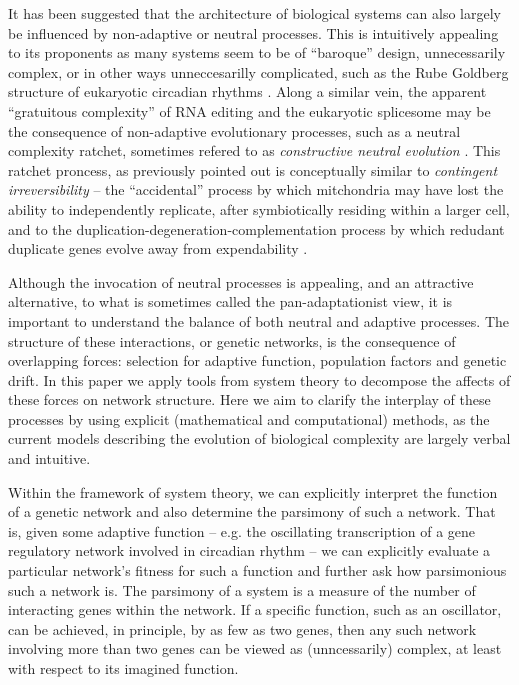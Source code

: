 \documentclass{article}
\newcommand{\1}{\mathbbm{1}}
\begin{document}
It has been suggested that the architecture of biological systems can also largely be influenced by non-adaptive
or neutral processes. This is intuitively appealing to its proponents as many systems seem to be of ``baroque''
design, unnecessarily complex, or in other ways unneccesarilly complicated, such as the Rube Goldberg structure
of eukaryotic circadian rhythms \citep{sancar2008intelligent}. 
Along a similar vein, the apparent ``gratuitous complexity'' of RNA editing \citep{covello1993evolution} and
the eukaryotic splicesome \citep{nilsen2003spliceosome, gray2010irremediable} may be the consequence of
non-adaptive evolutionary processes, such as a neutral complexity ratchet, sometimes refered to as
\emph{constructive neutral evolution} \citep{stoltzfus1999possibility, stoltzfus2012constructive, lukevs2011neutral}.
This ratchet proncess, as previously pointed out \citep{gray2010irremediable}
is conceptually similar to \emph{contingent irreversibility} \citep{szathmary1995major} -- the
``accidental'' process by which mitchondria may have lost the ability
to independently replicate, after symbiotically residing within a larger cell,
and to the duplication-degeneration-complementation process by which redudant
duplicate genes evolve away from expendability \citep{lynch2000probability}.

Although the invocation of neutral processes is appealing, and an attractive alternative,
to what is sometimes called the pan-adaptationist view, it is important to understand the
balance of both neutral and adaptive processes. 
The structure of these interactions, or genetic networks, is the consequence of
overlapping forces: selection for adaptive function, population factors and genetic drift. 
In this paper we apply tools from system theory to decompose the affects of these forces on
network structure. Here we aim to clarify the interplay of these processes by using
explicit (mathematical and computational) methods, as the current models describing
the evolution of biological complexity are largely verbal and intuitive. 

Within the framework of system theory, we can explicitly interpret the function of a
genetic network and also determine the parsimony of such a network.
That is, given some adaptive function -- e.g. the oscillating transcription of a
gene regulatory network involved in circadian rhythm -- we can explicitly
evaluate a particular network's fitness for such a function and further ask how
parsimonious such a network is. The parsimony of a system is a measure of the number
of interacting genes within the network. If a specific function, such as an oscillator,
can be achieved, in principle, by as few as two genes,
then any such network involving more than two genes can be viewed as (unncessarily) complex,
at least with respect to its imagined function.
\end{document}
